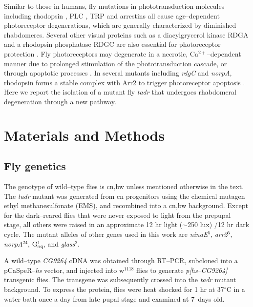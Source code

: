 Similar to those in humans, fly mutations in phototransduction molecules including rhodopsin \cite{Leonard1992,Kurada1995,Iakhine2004}, PLC \cite{Meyertholen1987,Zinkl1990,Alloway2000}, TRP \cite{Hong2002,Wang2005} and arrestins \cite{Dolph1993,Satoh2005} all cause age--dependent photoreceptor degenerations, which are generally characterized by diminished rhabdomeres.  Several other visual proteins such as a diacylgrycerol kinase RDGA and a rhodopsin phosphatase RDGC are also essential for photoreceptor protection \cite{Masai1993,Kiselev2000}. Fly photoreceptors may degenerate in a necrotic, Ca$^{2+}$--dependent manner due to prolonged stimulation of the phototransduction cascade, or through apoptotic processes \cite{Wang2007}.  In several mutants including \textit{rdgC} and \textit{norpA}, rhodopsin forms a stable complex with Arr2 to trigger photoreceptor apoptosis \cite{Alloway2000,Kiselev2000}.  Here we report the isolation of a mutant fly \textit{tadr} that undergoes rhabdomeral degeneration through a new pathway. 

\section{Materials and Methods}
\subsection{Fly genetics}
The genotype of wild--type flies is cn,bw unless mentioned otherwise in the text.  The \textit{tadr} mutant was generated from cn progenitors using the chemical mutagen ethyl methanesulfonate (EMS), and recombined into a cn,bw background.  Except for the dark--reared flies that were never exposed to light from the prepupal stage, all others were raised in an approximate 12 hr light ($\sim$250 lux) /12 hr dark cycle.  The mutant alleles of other genes used in this work are \textit{ninaE}$^5$, \textit{arr2}$^5$, \textit{norpA}$^{24}$, G$_{\alpha\texttt{q}}^{1}$, and \textit{glass}$^2$.

A wild--type \textit{CG9264} cDNA was obtained through RT--PCR, subcloned into a pCaSpeR--\textit{hs} vector, and injected into w$^{1118}$ flies to generate \textit{p[hs--CG9264]} transgenic flies.  The transgene was subsequently crossed into the \textit{tadr} mutant background.  To express the protein, flies were heat shocked for 1 hr at 37$^{\circ}\mathrm{C}$ in a water bath once a day from late pupal stage and examined at 7--days old.

